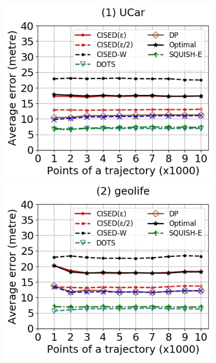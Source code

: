 {\begin{figure}[tb!]
	\centering
	\includegraphics[scale=0.250]{Figures/Exp-SED-error-size-service.jpg} 	\hspace{0.5ex}
	\includegraphics[scale=0.250]{Figures/Exp-SED-error-size-geolife.jpg}	\hspace{0.5ex}

\end{figure}}
